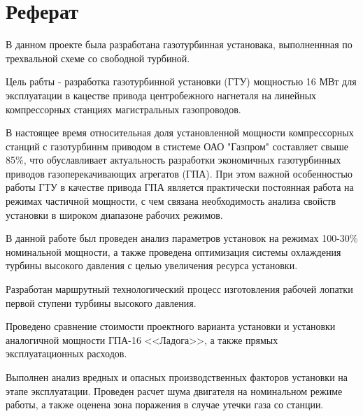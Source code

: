 \section*{Реферат}
В данном проекте была разработана газотурбинная установака, выполненнная
по трехвальной схеме со свободной турбиной.

Цель рабты - разработка газотурбинной установки (ГТУ) мощностью 16 МВт для 
эксплуатации в кацестве привода центробежного нагнеталя на линейных 
компрессорных станциях магистральных газопроводов.

В настоящее время относительная доля установленной мощности компрессорных станций с газотурбиннм приводом в стистеме ОАО "Газпром" составляет свыше 85\%, что обуславливает актуальность разработки экономичных газотурбинных приводов газоперекачивающих агрегатов (ГПА). При этом важной особенностью работы ГТУ в качестве привода ГПА является практически постоянная работа на режимах частичной мощности, с чем связана необходимость анализа свойств установки в широком диапазоне рабочих режимов.

В данной работе был проведен анализ параметров установок на режимах 100-30\% номинальной мощности, а также проведена оптимизация системы охлаждения турбины высокого давления с целью увеличения ресурса установки.

Разработан маршрутный технологический процесс изготовления рабочей лопатки первой ступени турбины высокого давления.

Проведено сравнение стоимости проектного варианта установки и установки аналогичной мощности ГПА-16 <<Ладога>>, а также прямых эксплуатационных расходов.

Выполнен анализ вредных и опасных производственных факторов установки на этапе эксплуатации. Проведен расчет шума двигателя на номинальном режиме работы, а также оценена зона поражения в случае утечки газа со станции.
